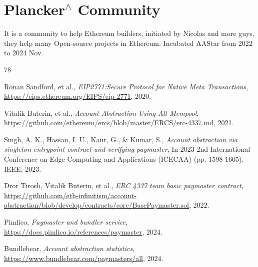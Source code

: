 \documentclass[preprint,12pt]{elsarticle}
\begin{document}
\section{Plancker$^\wedge$ Community}
It is a community to help Ethereum builders, initiated by Nicolas and more guys, they help many Open-source projects in Ethereum. Incubated AAStar from 2022 to 2024 Nov.

\begin{thebibliography}{78}

Ronan Sandford, et al.,
\textit{EIP2771:Secure Protocol for Native Meta Transactions},
\url{https://eips.ethereum.org/EIPS/eip-2771},
2020.

Vitalik Buterin, et al.,
\textit{Account Abstraction Using Alt Mempool},
\url{https://github.com/ethereum/ercs/blob/master/ERCS/erc-4337.md},
2021.

Singh, A. K., Hassan, I. U., Kaur, G., \& Kumar, S.,
\textit{Account abstraction via singleton entrypoint contract and verifying paymaster},
In 2023 2nd International Conference on Edge Computing and Applications (ICECAA) (pp. 1598-1605). IEEE,
2023.

Dror Tirosh, Vitalik Buterin, et al.,
\textit{ERC 4337 team basic paymaster contract},
\url{https://github.com/eth-infinitism/account-abstraction/blob/develop/contracts/core/BasePaymaster.sol},
2022.

Pimlico,
\textit{Paymaster and bundler service},
\url{https://docs.pimlico.io/references/paymaster},
2024.

Bundlebear,
\textit{Account abstraction statistics},
\url{https://www.bundlebear.com/paymasters/all},
2024.


\end{thebibliography}
\end{document}

